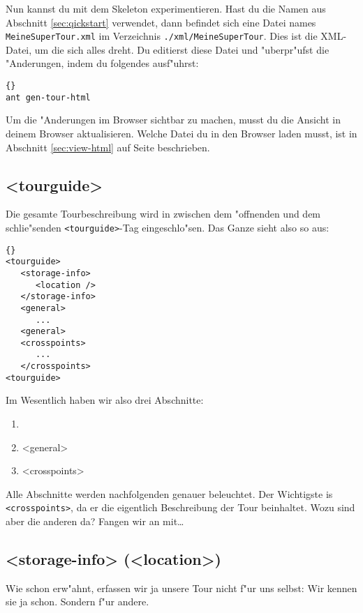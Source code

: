 Nun kannst du mit dem Skeleton experimentieren. Hast du die Namen aus 
Abschnitt \ref{sec:qickstart} verwendet, dann befindet sich eine 
Datei names \texttt{MeineSuperTour.xml} im Verzeichnis 
\texttt{./xml/MeineSuperTour}. Dies ist die XML-Datei, um die sich
alles dreht. Du editierst diese Datei und "uberpr"ufst die "Anderungen, 
indem du folgendes ausf"uhrst:
\lstset{numbers=left,numberstyle=\tiny,stepnumber=1}
\begin{lstlisting}{}
ant gen-tour-html
\end{lstlisting}

Um die "Anderungen im Browser sichtbar zu machen, musst du die
Ansicht in deinem Browser aktualisieren. Welche Datei du 
in den Browser laden musst, ist in Abschnitt \ref{sec:view-html}
auf Seite \pageref{sec:view-html} beschrieben.

\subsection{<tourguide>}

Die gesamte Tourbeschreibung wird in zwischen dem "offnenden und dem
schlie"senden \texttt{<tourguide>}-Tag eingeschlo"sen. Das Ganze sieht also
so aus:

\lstset{numbers=left,numberstyle=\tiny,stepnumber=1}
\begin{lstlisting}{}
<tourguide>
   <storage-info>
      <location />
   </storage-info>
   <general>
      ...
   <general>
   <crosspoints>
      ...
   </crosspoints>
<tourguide>
\end{lstlisting}

Im Wesentlich haben wir also drei Abschnitte:
\begin{enumerate}
\item <storage-info>
\item <general>
\item <crosspoints>
\end{enumerate}

Alle Abschnitte werden nachfolgenden genauer beleuchtet. Der
Wichtigste is \texttt{<crosspoints>}, da er die eigentlich
Beschreibung der Tour beinhaltet. Wozu sind aber die anderen
da? Fangen wir an mit\ldots

\subsection{<storage-info> (<location>)}
Wie schon erw"ahnt, erfassen wir ja unsere Tour nicht f"ur uns 
selbst: Wir kennen sie ja schon. Sondern f"ur andere.

